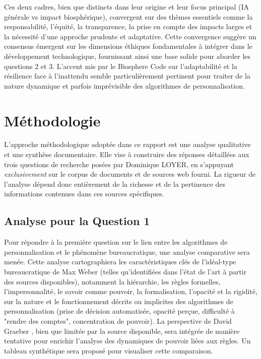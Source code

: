\documentclass[10pt, twocolumn]{article}
\begin{document}
Ces deux cadres, bien que distincts dans leur origine et leur focus principal (IA générale vs impact biosphérique), convergent sur des thèmes essentiels comme la responsabilité, l'équité, la transparence, la prise en compte des impacts larges et la nécessité d'une approche prudente et adaptative. Cette convergence suggère un consensus émergent sur les dimensions éthiques fondamentales à intégrer dans le développement technologique, fournissant ainsi une base solide pour aborder les questions 2 et 3. L'accent mis par le Biosphere Code sur l'adaptabilité \citep{Biosphere2015} et la résilience face à l'inattendu \citep{Biosphere2015} semble particulièrement pertinent pour traiter de la nature dynamique et parfois imprévisible des algorithmes de personnalisation.


\section{Méthodologie}

L'approche méthodologique adoptée dans ce rapport est une analyse qualitative et une synthèse documentaire. Elle vise à construire des réponses détaillées aux trois questions de recherche posées par Dominique LOYER, en s'appuyant \textit{exclusivement} sur le corpus de documents et de sources web fourni. La rigueur de l'analyse dépend donc entièrement de la richesse et de la pertinence des informations contenues dans ces sources spécifiques.

\subsection{Analyse pour la Question 1}
Pour répondre à la première question sur le lien entre les algorithmes de personnalisation et le phénomène bureaucratique, une analyse comparative sera menée. Cette analyse cartographiera les caractéristiques clés de l'idéal-type bureaucratique de Max Weber (telles qu'identifiées dans l'état de l'art à partir des sources disponibles), notamment la hiérarchie, les règles formelles, l'impersonnalité, le savoir comme pouvoir, la formalisation, l'opacité et la rigidité, sur la nature et le fonctionnement décrits ou implicites des algorithmes de personnalisation (prise de décision automatisée, opacité perçue, difficulté à "rendre des comptes", concentration de pouvoir). La perspective de David Graeber \citep{Graeber2015}, bien que limitée par la source disponible, sera intégrée de manière tentative pour enrichir l'analyse des dynamiques de pouvoir liées aux règles. Un tableau synthétique sera proposé pour visualiser cette comparaison.
\end{document}
